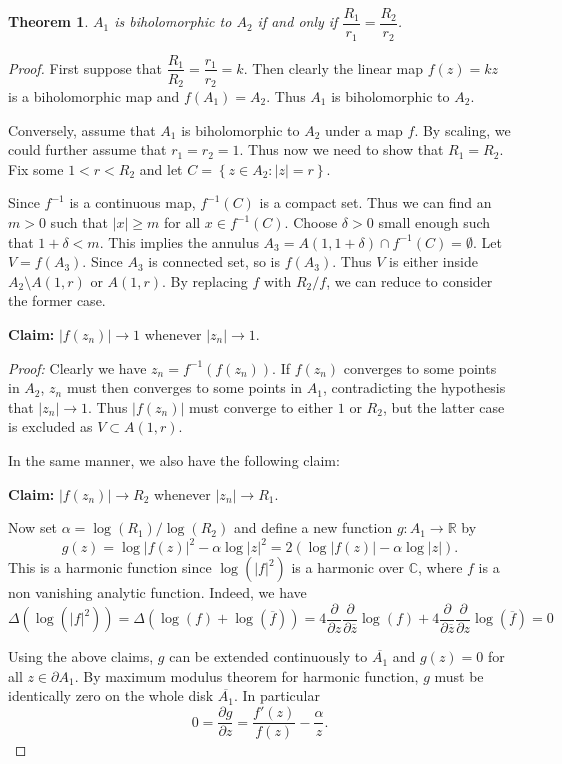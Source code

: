 \documentclass[12pt]{article} %
\newtheorem{theorem}{Theorem}
\begin{document}
\begin{theorem}
  $A_1$ is biholomorphic to $A_2$ if and only if $\dfrac{R_1}{r_1} = \dfrac{R_2}{r_2}$.
\end{theorem}
\begin{proof}
  First suppose that $\dfrac{R_1}{R_2} = \dfrac{r_1}{r_2} =k$. Then clearly the linear map $f(z)=kz$
  is a biholomorphic map and $f(A_1) = A_2$. Thus $A_1$ is biholomorphic to $A_2$.

  Conversely, assume that $A_1$ is biholomorphic to $A_2$ under a map $f$. By scaling, we could further assume that $r_1=r_2=1$. Thus now we need to show that $R_1=R_2$.
  Fix some $1<r<R_2$ and let $C = \left\lbrace z \in A_2 \colon |z|=r\right\rbrace$.

  Since $f^{-1}$ is a continuous map, $f^{-1}(C)$ is a compact set. Thus we can find
  an $m>0$ such that $|x| \ge m$ for all $x \in f^{-1}(C)$. Choose $\delta>0$ small enough
  such that $1+\delta<m$. This implies the annulus $A_3 = A(1,1+\delta) \cap f^{-1}(C)=\emptyset$. Let
  $V = f(A_3)$. Since $A_3$ is connected set, so is $f(A_3)$. Thus $V$ is either inside
  $A_2\setminus A(1,r)$ or $A(1,r)$. By replacing $f$ with $R_2/f$, we can reduce to consider the former case.

  \textbf{Claim:} $|f(z_n)| \to 1$ whenever $|z_n| \to 1$.

  \textit{Proof:} Clearly we have $z_n = f^{-1}(f(z_n))$. If $f(z_n)$ converges to some points
  in $A_2$, $z_n$ must then converges to some points in $A_1$, contradicting the hypothesis that
  $|z_n| \to 1$. Thus $|f(z_n)|$ must converge to either $1$ or $R_2$, but the latter case is excluded as $V \subset A(1,r)$.

  In the same manner, we also have the following claim:

  \textbf{Claim:} $|f(z_n)| \to R_2$ whenever $|z_n| \to R_1$.

  Now set $\alpha = \log(R_1)/\log(R_2)$ and define a new function $g \colon A_1 \to \mathbb{R}$ by
  \[g(z) = \log|f(z)|^2 - \alpha\log|z|^2 = 2(\log|f(z)| - \alpha\log|z|).\]
  This is a harmonic function since $\log(|f|^2)$ is a harmonic over $\mathbb{C}$, where $f$ is a non vanishing analytic function. Indeed, we have
  \[\Delta\left(\log(|f|^2)\right)= \Delta\left(\log(f)+\log(\overline{f})\right)
    = 4\dfrac{\partial}{\partial z}\dfrac{\partial}{\partial \overline{z}}\log(f)+4\dfrac{\partial}{\partial \overline{z}}\dfrac{\partial}{\partial z}\log(\overline{f})=0\]

  Using the above claims, $g$ can be
  extended continuously to $\overline{A_1}$ and $g(z)=0$ for all $z \in \partial A_1$. By maximum
  modulus theorem for harmonic function, $g$ must be identically zero on the whole disk $\overline{A_1}$.
  In particular
  \[ 0 = \dfrac{\partial g}{\partial z} = \dfrac{f'(z)}{f(z)}-\dfrac{\alpha}{z}.\]


\end{proof}
\end{document}
